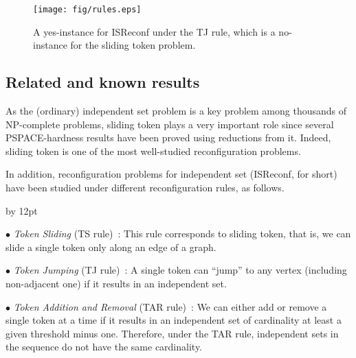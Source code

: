 \documentclass{llncs}
\newenvironment{listing}[1]{\begin{list}{*}{\settowidth{\labelwidth}{#1}\setlength{\leftmargin}{\labelwidth}\advance \leftmargin by 12pt
\setlength{\itemsep}{0pt}\setlength{\parsep}{0pt}\setlength{\topsep}{0pt}\setlength{\parskip}{0pt}}}{\end{list}}
\newcounter{one}
\begin{document}
\begin{figure}[b]
\begin{center}
\texttt{[image: fig/rules.eps]}
\end{center}
\vspace{-1em}
\caption{A yes-instance for {\sc ISReconf} under the TJ rule, 
which is a no-instance for the {\sc sliding token} problem.}
\label{fig:rules}
\end{figure}


\subsection{Related and known results}

As the (ordinary) {\sc independent set} problem is a key problem among thousands of NP-complete problems,
{\sc sliding token} plays a very important role since 
several PSPACE-hardness results have been proved using reductions from it.
Indeed, {\sc sliding token} is one of the most well-studied reconfiguration problems.  

	In addition, reconfiguration problems for {\sc independent set} ({\sc ISReconf}, for short) have been studied under different reconfiguration rules, as follows.
\smallskip

	\begin{listing}{aaa}
	\item[$\bullet$]{\em Token Sliding} (TS rule)~\cite{BC09,BKW14,HearnDemaine2005,HearnDemaine2009,KaminskiMedvedevMilanic2012,Wro14}: 
      This rule corresponds to {\sc sliding token}, that is, 
      we can slide a single token only along an edge of a graph.
							\smallskip
	
	\item[$\bullet$] {\em Token Jumping} (TJ rule)~\cite{BKW14,ItoKaminskiOnoSuzukiUeharaYamanaka2014,KaminskiMedvedevMilanic2012,Wro14}: 
      A single token can ``jump'' to any vertex (including non-adjacent one) 
      if it results in an independent set.
							\smallskip
							
	\item[$\bullet$] {\em Token Addition and Removal} (TAR rule)~\cite{BB14,Bon14,IDHPSUU,KaminskiMedvedevMilanic2012,MNRSS13,MNRW14,Wro14}: 
      We can either add or remove a single token at a time 
      if it results in an independent set of cardinality at least a given threshold minus one. 
      Therefore, under the TAR rule, independent sets in the sequence do not have the same cardinality.
	\end{listing}
\smallskip
\end{document}
